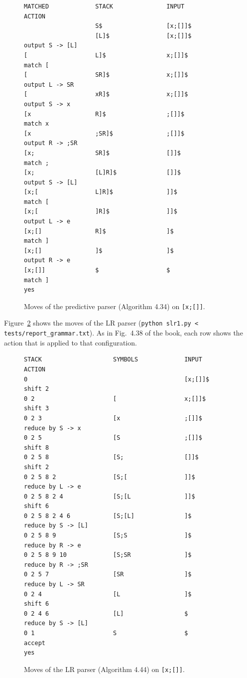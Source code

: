 \documentclass[11pt,a4paper]{article}
\newcommand{\code}[1]{\texttt{#1}}
\begin{document}
\begin{figure}[H]
\begin{lstlisting}
MATCHED             STACK               INPUT               ACTION
                    S$                  [x;[]]$
                    [L]$                [x;[]]$             output S -> [L]
[                   L]$                 x;[]]$              match [
[                   SR]$                x;[]]$              output L -> SR
[                   xR]$                x;[]]$              output S -> x
[x                  R]$                 ;[]]$               match x
[x                  ;SR]$               ;[]]$               output R -> ;SR
[x;                 SR]$                []]$                match ;
[x;                 [L]R]$              []]$                output S -> [L]
[x;[                L]R]$               ]]$                 match [
[x;[                ]R]$                ]]$                 output L -> e
[x;[]               R]$                 ]$                  match ]
[x;[]               ]$                  ]$                  output R -> e
[x;[]]              $                   $                   match ]
yes
\end{lstlisting}
\caption{Moves of the predictive parser (Algorithm 4.34) on \code{[x;[]]}.}
\label{lst:ll}
\end{figure}

Figure~\ref{lst:lr} shows the moves of the LR parser (\code{python slr1.py < tests/report\_grammar.txt}). As in Fig.~4.38 of the book, each row shows the action that is applied to that configuration.

\begin{figure}[H]
\begin{lstlisting}
STACK                    SYMBOLS             INPUT               ACTION
0                                            [x;[]]$             shift 2
0 2                      [                   x;[]]$              shift 3
0 2 3                    [x                  ;[]]$               reduce by S -> x
0 2 5                    [S                  ;[]]$               shift 8
0 2 5 8                  [S;                 []]$                shift 2
0 2 5 8 2                [S;[                ]]$                 reduce by L -> e
0 2 5 8 2 4              [S;[L               ]]$                 shift 6
0 2 5 8 2 4 6            [S;[L]              ]$                  reduce by S -> [L]
0 2 5 8 9                [S;S                ]$                  reduce by R -> e
0 2 5 8 9 10             [S;SR               ]$                  reduce by R -> ;SR
0 2 5 7                  [SR                 ]$                  reduce by L -> SR
0 2 4                    [L                  ]$                  shift 6
0 2 4 6                  [L]                 $                   reduce by S -> [L]
0 1                      S                   $                   accept
yes
\end{lstlisting}
\caption{Moves of the LR parser (Algorithm 4.44) on \code{[x;[]]}.}
\label{lst:lr}
\end{figure}
\end{document}
